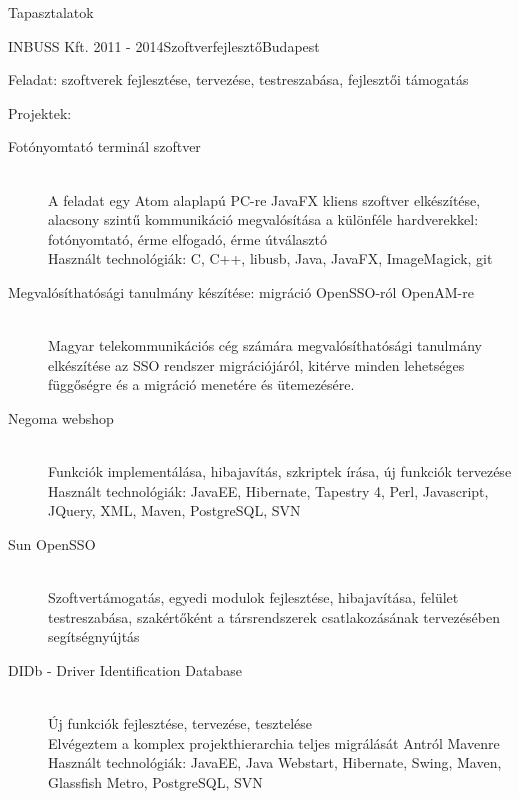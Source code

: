 \documentclass{resume} %
\begin{document}
\begin{rSection}{Tapasztalatok}

\begin{rSubsection}{INBUSS Kft.}
{2011 - 2014}{Szoftverfejlesztő}{Budapest}
\item Feladat: szoftverek fejlesztése, tervezése, testreszabása, fejlesztői támogatás
\item Projektek:
	\begin{description}
		\item[Fotónyomtató terminál szoftver] \hfill \\
		A feladat egy Atom alaplapú PC-re JavaFX kliens szoftver elkészítése, alacsony szintű kommunikáció
		megvalósítása a különféle hardverekkel: fotónyomtató, érme elfogadó, érme útválasztó \\
		Használt technológiák: C, C++, libusb, Java, JavaFX, ImageMagick, git
		\item[Megvalósíthatósági tanulmány készítése: migráció OpenSSO-ról OpenAM-re] \hfill \\
		Magyar telekommunikációs cég számára megvalósíthatósági tanulmány elkészítése az SSO rendszer migrációjáról,
		kitérve minden lehetséges függőségre és a migráció menetére és ütemezésére.
		\item[Negoma webshop] \hfill \\
		Funkciók implementálása, hibajavítás, szkriptek írása, új funkciók tervezése \\
		Használt technológiák: JavaEE, Hibernate, Tapestry 4, Perl, Javascript, JQuery, XML, Maven, PostgreSQL, SVN
		\item[Sun OpenSSO] \hfill \\
		Szoftvertámogatás, egyedi modulok fejlesztése, hibajavítása, felület testreszabása,
		szakértőként a társrendszerek csatlakozásának tervezésében segítségnyújtás
		\item[DIDb - Driver Identification Database] \hfill \\
		Új funkciók fejlesztése, tervezése, tesztelése \\
		Elvégeztem a komplex projekthierarchia teljes migrálását Antról Mavenre \\
		Használt technológiák: JavaEE, Java Webstart, Hibernate, Swing, Maven, Glassfish Metro, PostgreSQL, SVN \\
	\end{description}
\end{rSubsection}



\end{rSection}
\end{document}
